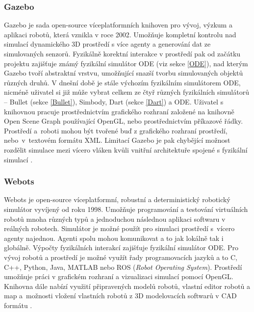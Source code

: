 \subsubsection{Gazebo} \label{Gazebo}
Gazebo \citep{gazeborobotics} je sada open-source víceplatformních knihoven pro
vývoj, výzkum a aplikaci robotů, která vznikla v roce 2002. Umožňuje kompletní
kontrolu nad simulací dynamického 3D prostředí s více agenty a generování dat
ze simulovaných senzorů. Fyzikálně korektní interakce v prostředí pak od
začátku projektu zajišťuje známý fyzikální simulátor ODE (viz sekce \ref{ODE}),
nad kterým Gazebo tvoří abstraktní vrstvu, umožňující snazší tvorbu
simulovaných objektů různých druhů. V dnešní době je stále výchozím fyzikálním
simulátorem ODE, nicméně uživatel si již může vybrat celkem ze čtyř různých
fyzikálních simulátorů -- Bullet (sekce \ref{Bullet}), Simbody, Dart (sekce
\ref{Dart}) a ODE. Uživatel s knihovnou pracuje prostřednictvím grafického
rozhraní založené na knihovně Open Scene Graph používající OpenGL, nebo
prostřednictvím příkazové řádky. Prostředí a~roboti mohou být tvořené buď z
grafického rozhraní prostředí, nebo~v~textovém formátu XML. Limitací Gazebo je
pak chybějící možnost rozdělit simulace mezi vícero vláken kvůli vnitřní
architektuře spojené s fyzikální simulací \citep{koenig2004design}. 

\subsubsection{Webots} \label{Webots}
Webots \citep{Webots} je open-source víceplatformní, robustní a deterministický
robotický simulátor vyvíjený od roku 1998. Umožňuje programování a testování
virtuálních robotů mnoha různých typů a jednoduchou následnou aplikaci softwaru
v reálných robotech. Simulátor je možné použít pro simulaci prostředí s~vícero
agenty najednou. Agenti spolu mohou komunikovat a to jak lokálně tak i
globálně. Výpočty fyzikálních interakcí zajišťuje fyzikální simulátor ODE. Pro
vývoj robotů a prostředí je možné využít řady programovacích jazyků a to C,
C++, Python, Java, MATLAB nebo ROS (\emph{Robot Operating System}). Prostředí
umožňuje práci v grafickém rozhraní a vizualizaci simulací pomocí OpenGL.
Knihovna dále nabízí využití připravených modelů robotů, vlastní editor robotů
a map a~možnosti vložení vlastních robotů z 3D modelovacích softwarů v CAD
formátu \citep{michel2004cyberbotics}.

